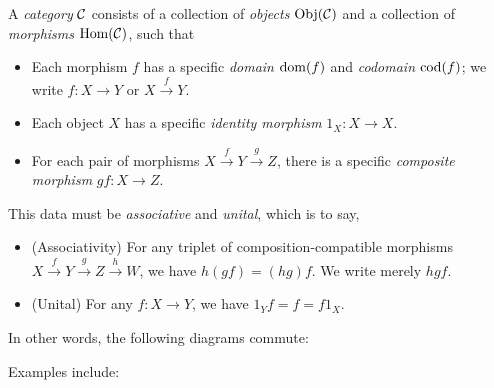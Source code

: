 


\begin{dfn*}[Category]
	A \emph{category} $\mathcal{C}$ consists of a collection of \emph{objects} $\operatorname{Obj}(\mathcal{C})$
	and a collection of \emph{morphisms} $\operatorname{Hom}(\mathcal{C})$, such that

	\begin{itemize}
		\item Each morphism $f$ has a specific \emph{domain} $\operatorname{dom}(f)$ and
		      \emph{codomain} $\operatorname{cod}(f)$; we write $f: X\rightarrow Y$ or
		      $X\xrightarrow{f} Y$.
		\item Each object $X$ has a specific \emph{identity morphism} $1_X:
			      X\rightarrow X$.
		\item For each pair of morphisms $X\xrightarrow{f} Y\xrightarrow{g}
			      Z$, there is a specific \emph{composite morphism} $gf:
			      X\rightarrow Z$.
	\end{itemize}
	This data must be \emph{associative} and \emph{unital}, which is to say,
	\begin{itemize}
		\item (Associativity) For any triplet of composition-compatible morphisms
		      $X\xrightarrow{f}Y \xrightarrow{g}Z\xrightarrow{h}W$, we have $h(gf) =
			      (hg)f$. We write merely $hgf$.
		\item (Unital) For any $f: X\rightarrow Y$, we have $1_Yf = f = f1_X$.
	\end{itemize}

	In other words, the following diagrams commute:

	\begin{figure}[H]
		\centering
		\begin{multicols}{2}

		\end{multicols}
	\end{figure}
\end{dfn*}

Examples include:


